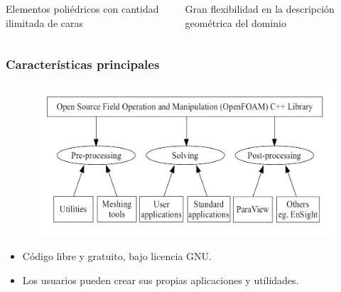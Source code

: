 \begin{frame}
\begin{columns}
        \begin{block}{}
            \centering
            Elementos poli\'edricos con cantidad ilimitada de caras
        \end{block}  
        
        \begin{block}{}
            \centering
            Gran flexibilidad en la descripci\'on geom\'etrica del dominio
        \end{block}
        
    \end{columns}        
    
\end{frame}




\begin{frame}
    \frametitle{Caracter\'isticas principales}
    

    \begin{figure}
        \centering
        \includegraphics[scale=0.4]{Imagenes/diagrama}
    \end{figure}
    
    \begin{exampleblock}{}
        \footnotesize
        \begin{itemize}
            \item C\'odigo libre y gratuito, bajo licencia GNU.
            \item Los usuarios pueden crear sus propias aplicaciones y utilidades.
        \end{itemize} 
    \end{exampleblock}
    
\end{frame}





